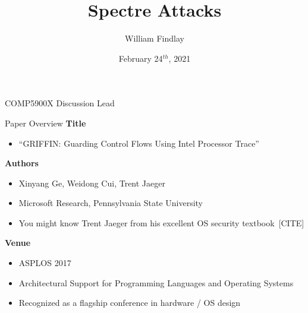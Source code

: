 \documentclass[12pt, dvipsnames, aspectratio=169]{beamer}
\date{February 24$^{th}$, 2021}
\title{Spectre Attacks}
\author{William Findlay}
\institute{Carleton University\\\href{mailto:will@ccsl.carleton.ca}{\ttfamily will@ccsl.carleton.ca}}
\newcommand{\todo}[1]{{\color{orange}[#1]}}
\begin{document}

\begin{frame}
  \titlepage%
  \vfill
  \vspace{4em}
  {\footnotesize COMP5900X Discussion Lead}
\end{frame}

%

\begin{frame}[c]{Paper Overview}{}
  {\bf Title}
  \begin{itemize}
    \item \enquote{GRIFFIN: Guarding Control Flows Using Intel Processor Trace}
  \end{itemize}

  \vfill
  {\bf Authors}
  \begin{itemize}
    \item Xinyang Ge, Weidong Cui, Trent Jaeger
    \item Microsoft Research, Pennsylvania State University
    \item You might know Trent Jaeger from his excellent OS security textbook~\todo{CITE}
  \end{itemize}

  \vfill
  {\bf Venue}
  \begin{itemize}
    \item ASPLOS 2017
    \item Architectural Support for Programming Languages and Operating Systems
    \item Recognized as a flagship conference in hardware / OS design
  \end{itemize}
\end{frame}
\end{document}
